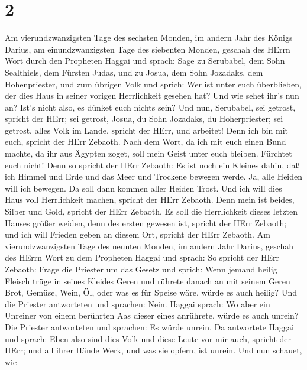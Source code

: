 \hypertarget{section-1}{%
\section{2}\label{section-1}}

 Am vierundzwanzigsten Tage des sechsten Monden, im andern
Jahr des Königs Darius,  am einundzwanzigsten Tage des
siebenten Monden, geschah des HErrn Wort durch den Propheten Haggai und
sprach:  Sage zu Serubabel, dem Sohn Sealthiels, dem Fürsten
Judas, und zu Josua, dem Sohn Jozadaks, dem Hohenpriester, und zum
übrigen Volk und sprich:  Wer ist unter euch überblieben,
der dies Haus in seiner vorigen Herrlichkeit gesehen hat? Und wie sehet
ihr's nun an? Ist's nicht also, es dünket euch nichts sein? 
Und nun, Serubabel, sei getrost, spricht der HErr; sei getrost, Josua,
du Sohn Jozadaks, du Hoherpriester; sei getrost, alles Volk im Lande,
spricht der HErr, und arbeitet! Denn ich bin mit euch, spricht der HErr
Zebaoth.  Nach dem Wort, da ich mit euch einen Bund machte,
da ihr aus Ägypten zoget, soll mein Geist unter euch bleiben. Fürchtet
euch nicht!  Denn so spricht der HErr Zebaoth: Es ist noch
ein Kleines dahin, daß ich Himmel und Erde und das Meer und Trockene
bewegen werde.  Ja, alle Heiden will ich bewegen. Da soll
dann kommen aller Heiden Trost. Und ich will dies Haus voll Herrlichkeit
machen, spricht der HErr Zebaoth.  Denn mein ist beides,
Silber und Gold, spricht der HErr Zebaoth.  Es soll die
Herrlichkeit dieses letzten Hauses größer weiden, denn des ersten
gewesen ist, spricht der HErr Zebaoth; und ich will Frieden geben an
diesem Ort, spricht der HErr Zebaoth.  Am
vierundzwanzigsten Tage des neunten Monden, im andern Jahr Darius,
geschah des HErrn Wort zu dem Propheten Haggai und sprach: 
So spricht der HErr Zebaoth: Frage die Priester um das Gesetz und
sprich:  Wenn jemand heilig Fleisch trüge in seines Kleides
Geren und rührete danach an mit seinem Geren Brot, Gemüse, Wein, Öl,
oder was es für Speise wäre, würde es auch heilig? Und die Priester
antworteten und sprachen: Nein.  Haggai sprach: Wo aber ein
Unreiner von einem berührten Aas dieser eines anrührete, würde es auch
unrein? Die Priester antworteten und sprachen: Es würde unrein.
 Da antwortete Haggai und sprach: Eben also sind dies Volk
und diese Leute vor mir auch, spricht der HErr; und all ihrer Hände
Werk, und was sie opfern, ist unrein.  Und nun schauet, wie
